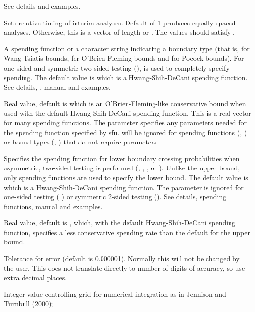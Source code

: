 \begin{Arguments}
\begin{ldescription}
See details and examples.
\item[\code{timing}] Sets relative timing of interim analyses. Default of 1 produces equally spaced analyses. 
Otherwise, this is a vector of length  or .
The values should satisfy .
\item[\code{sfu}] A spending function or a character string indicating a boundary type 
(that is,  for Wang-Tsiatis bounds,  for O'Brien-Fleming bounds and  for Pocock bounds). 
For one-sided and symmetric two-sided testing (), 
 is used to completely specify spending. 
The default value is  which is a Hwang-Shih-DeCani spending function.
See details, , manual and examples.
\item[\code{sfupar}] Real value, default is  which is an O'Brien-Fleming-like conservative bound when used
with the default Hwang-Shih-DeCani spending function. This is a real-vector for many spending functions.
The parameter  specifies any parameters needed for the spending function specified by sfu. 
 will be ignored for spending functions (, ) 
or bound types (, ) that do not require parameters.
\item[\code{sfl}] Specifies the spending function for lower boundary crossing probabilities when
asymmetric, two-sided testing is performed (, 
, , or ). 
Unlike the upper bound, only spending functions are used to specify the lower bound.
The default value is  which is a Hwang-Shih-DeCani spending function.
The parameter  is ignored for one-sided testing (
) or symmetric 2-sided testing (). 
See details, spending functions, manual and examples.
\item[\code{sflpar}] Real value, default is , which, with the default Hwang-Shih-DeCani spending function, 
specifies a less conservative spending rate than the default for the upper bound.
\item[\code{tol}] Tolerance for error (default is 0.000001). Normally this will not be changed by the user.
This does not translate directly to number of digits of accuracy, so use extra decimal places.
\item[\code{r}] Integer value controlling grid for numerical integration as in Jennison and Turnbull (2000); 

\end{ldescription}
\end{Arguments}
